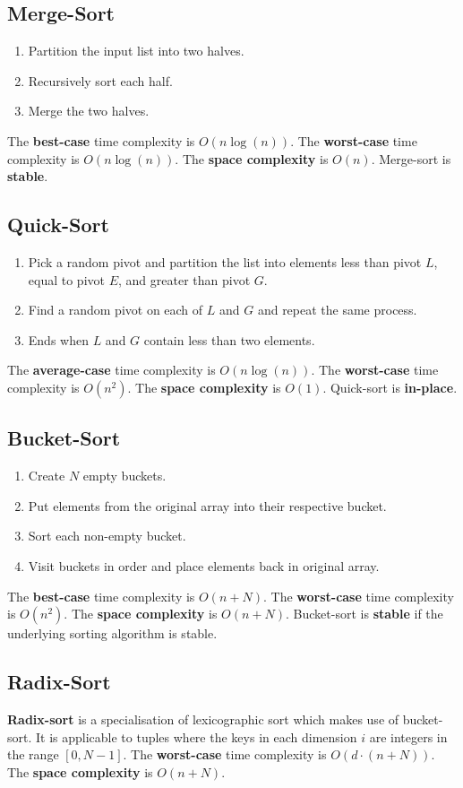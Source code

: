 \documentclass[12pt]{extarticle}
\newcommand{\N}{\newline\newline}
\begin{document}
	\subsection{Merge-Sort}
	\begin{enumerate}
		\item
		Partition the input list into two halves.
		\item
		Recursively sort each half.
		\item
		Merge the two halves.
	\end{enumerate}
	The \textbf{best-case} time complexity is $O(n\log{(n)})$.\N
	The \textbf{worst-case} time complexity is $O(n\log{(n)})$.\N
	The \textbf{space complexity} is $O(n)$.\N
	Merge-sort is \textbf{stable}.
	\subsection{Quick-Sort}
	\begin{enumerate}
		\item
		Pick a random pivot and partition the list into elements less than pivot $L$, equal to pivot $E$, and greater than pivot $G$.
		\item
		Find a random pivot on each of $L$ and $G$ and repeat the same process.
		\item
		Ends when $L$ and $G$ contain less than two elements.
	\end{enumerate}
	The \textbf{average-case} time complexity is $O(n\log{(n)})$.\N
	The \textbf{worst-case} time complexity is $O(n^{2})$.\N
	The \textbf{space complexity} is $O(1)$.\N
	Quick-sort is \textbf{in-place}.
	\subsection{Bucket-Sort}
	\begin{enumerate}
		\item
		Create $N$ empty buckets.
		\item
		Put elements from the original array into their respective bucket.
		\item
		Sort each non-empty bucket.
		\item
		Visit buckets in order and place elements back in original array.
	\end{enumerate}
	The \textbf{best-case} time complexity is $O(n + N)$.\N
	The \textbf{worst-case} time complexity is $O(n^{2})$.\N
	The \textbf{space complexity} is $O(n + N)$.\N
	Bucket-sort is \textbf{stable} if the underlying sorting algorithm is stable.
	\subsection{Radix-Sort}
	\textbf{Radix-sort} is a specialisation of lexicographic sort which makes use of bucket-sort.\N
	It is applicable to tuples where the keys in each dimension $i$ are integers in the range $[0,N-1]$.\N
	The \textbf{worst-case} time complexity is $O(d\cdot(n+N))$.\N
	The \textbf{space complexity} is $O(n + N)$.
\end{document}
